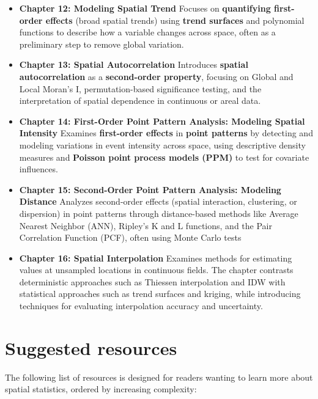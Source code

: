 \documentclass[
  letterpaper,
]{book}
\begin{document}
\begin{itemize}
\item
  \textbf{Chapter 12: Modeling Spatial Trend} Focuses on
  \textbf{quantifying first-order effects} (broad spatial trends) using
  \textbf{trend surfaces} and polynomial functions to describe how a
  variable changes across space, often as a preliminary step to remove
  global variation.
\item
  \textbf{Chapter 13: Spatial Autocorrelation} Introduces
  \textbf{spatial autocorrelation} as a \textbf{second-order property},
  focusing on Global and Local Moran's I, permutation-based significance
  testing, and the interpretation of spatial dependence in continuous or
  areal data.
\item
  \textbf{Chapter 14: First-Order Point Pattern Analysis: Modeling
  Spatial Intensity} Examines \textbf{first-order effects} in
  \textbf{point patterns} by detecting and modeling variations in event
  intensity across space, using descriptive density measures and
  \textbf{Poisson point process models (PPM)} to test for covariate
  influences.
\item
  \textbf{Chapter 15: Second-Order Point Pattern Analysis: Modeling
  Distance} Analyzes second-order effects (spatial interaction,
  clustering, or dispersion) in point patterns through distance-based
  methods like Average Nearest Neighbor (ANN), Ripley's K and L
  functions, and the Pair Correlation Function (PCF), often using Monte
  Carlo tests
\item
  \textbf{Chapter 16: Spatial Interpolation} Examines methods for
  estimating values at unsampled locations in continuous fields. The
  chapter contrasts deterministic approaches such as Thiessen
  interpolation and IDW with statistical approaches such as trend
  surfaces and kriging, while introducing techniques for evaluating
  interpolation accuracy and uncertainty.
\end{itemize}

\section{Suggested resources}\label{suggested-resources}

The following list of resources is designed for readers wanting to learn
more about spatial statistics, ordered by increasing complexity:
\end{document}

